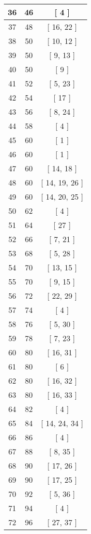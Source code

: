 \begin{center}
\begin{longtable}[H]{|| c c c ||}
\hline
36 & 46 & [ 4 ] \\ 
\hline
37 & 48 & [ 16, 22 ] \\ 
\hline
38 & 50 & [ 10, 12 ] \\ 
\hline
39 & 50 & [ 9, 13 ] \\ 
\hline
40 & 50 & [ 9 ] \\ 
\hline
41 & 52 & [ 5, 23 ] \\ 
\hline
42 & 54 & [ 17 ] \\ 
\hline
43 & 56 & [ 8, 24 ] \\ 
\hline
44 & 58 & [ 4 ] \\ 
\hline
45 & 60 & [ 1 ] \\ 
\hline
46 & 60 & [ 1 ] \\ 
\hline
47 & 60 & [ 14, 18 ] \\ 
\hline
48 & 60 & [ 14, 19, 26 ] \\ 
\hline
49 & 60 & [ 14, 20, 25 ] \\ 
\hline
50 & 62 & [ 4 ] \\ 
\hline
51 & 64 & [ 27 ] \\ 
\hline
52 & 66 & [ 7, 21 ] \\ 
\hline
53 & 68 & [ 5, 28 ] \\ 
\hline
54 & 70 & [ 13, 15 ] \\ 
\hline
55 & 70 & [ 9, 15 ] \\ 
\hline
56 & 72 & [ 22, 29 ] \\ 
\hline
57 & 74 & [ 4 ] \\ 
\hline
58 & 76 & [ 5, 30 ] \\ 
\hline
59 & 78 & [ 7, 23 ] \\ 
\hline
60 & 80 & [ 16, 31 ] \\ 
\hline
61 & 80 & [ 6 ] \\ 
\hline
62 & 80 & [ 16, 32 ] \\ 
\hline
63 & 80 & [ 16, 33 ] \\ 
\hline
64 & 82 & [ 4 ] \\ 
\hline
65 & 84 & [ 14, 24, 34 ] \\ 
\hline
66 & 86 & [ 4 ] \\ 
\hline
67 & 88 & [ 8, 35 ] \\ 
\hline
68 & 90 & [ 17, 26 ] \\ 
\hline
69 & 90 & [ 17, 25 ] \\ 
\hline
70 & 92 & [ 5, 36 ] \\ 
\hline
71 & 94 & [ 4 ] \\ 
\hline
72 & 96 & [ 27, 37 ] \\ 

\end{longtable}
\end{center}
